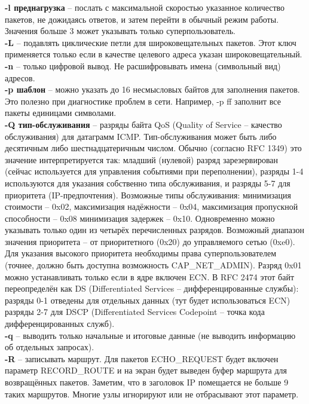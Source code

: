 \documentclass[a4paper]{article}
\begin{document}
\textbf{-l преднагрузка} -- послать с максимальной скоростью указанное количество пакетов, не дожидаясь ответов, и затем перейти в обычный режим работы. Значения больше 3 может указывать только суперпользователь.\\
\textbf{-L} -- подавлять циклические петли для широковещательных пакетов. Этот ключ применяется только если в качестве целевого адреса указан широковещательный.\\
\textbf{-n} -- только цифровой вывод. Не расшифровывать имена (символьный вид) адресов.\\
\textbf{-p шаблон} -- можно указать до 16 несмысловых байтов для заполнения пакетов. Это полезно при диагностике проблем в сети. Например, -p ff заполнит все пакеты единицами символами.\\
\textbf{-Q тип-обслуживания} -- разряды байта QoS (Quality of Service -- качество обслуживания) для датаграмм ICMP. Тип-обслуживания может быть либо десятичным либо шестнадцатеричным числом. Обычно (согласно RFC 1349) это значение интерпретируется так: младший (нулевой) разряд зарезервирован (сейчас используется для управления событиями при переполнении), разряды 1-4 используются для указания собственно типа обслуживания, и разряды 5-7 для приоритета (IP-предпочтения). Возможные типы обслуживания: минимизация стоимости -- 0x02, максимизация надёжности -- 0x04, максимизация пропускной способности -- 0x08 минимизация задержек -- 0x10. Одновременно можно указывать только один из четырёх перечисленных разрядов. Возможный диапазон значения приоритета -- от приоритетного (0x20) до управляемого сетью (0xe0). Для указания высокого приоритета необходимы права суперпользователем (точнее, должно быть доступна возможность CAP\_NET\_ADMIN). Разряд 0x01 можно устанавливать только если в ядре включен ECN.
В RFC 2474 этот байт переопределён как DS (Differentiated Services -- дифференцированные службы): разряды 0-1 отведены для отдельных данных (тут будет использоваться ECN) разряды 2-7 для DSCP (Differentiated Services Codepoint -- точка кода дифференцированных служб).\\
\textbf{-q} -- выводить только начальные и итоговые данные (не выводить информацию об отдельных запросах).\\
\textbf{-R} -- записывать маршрут. Для пакетов ECHO\_REQUEST будет включен параметр RECORD\_ROUTE и на экран будет выведен буфер маршрута для возвращённых пакетов. Заметим, что в заголовок IP помещается не больше 9 таких маршрутов. Многие узлы игнорируют или не отбрасывают этот параметр.\\
\end{document}
